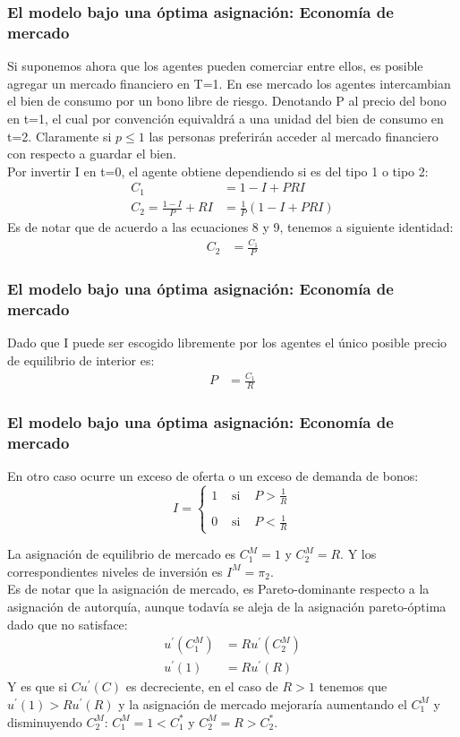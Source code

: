 \begin{frame}
    \frametitle{{\normalsize El modelo bajo una óptima asignación: Economía de mercado } {}}
    Si suponemos ahora que los agentes pueden comerciar entre ellos, es posible agregar un mercado financiero en T=1. En ese mercado los agentes intercambian el bien de consumo por un bono libre de riesgo. Denotando P al precio del bono en t=1, el cual por convención equivaldrá a una unidad del bien de consumo en t=2. Claramente si $p\leq1 $ las personas preferirán acceder al mercado financiero con respecto a guardar el bien.\\
    Por invertir I en t=0, el agente obtiene dependiendo si es del tipo 1 o tipo 2:
      \begin{align}
      C_{1}&=1-I+PRI\\
      C_{2}=\frac{1-I}{P}+RI&=\frac{1}{P}\left( 1-I+PRI\right) 
      \end{align}
    Es de notar que de acuerdo a las ecuaciones 8 y 9, tenemos a siguiente identidad:
     \begin{align}
     C_{2}&=\frac{C_{1}}{P}
    \end{align}

 \end{frame}

\begin{frame}
\frametitle{{\normalsize El modelo bajo una óptima asignación: Economía de mercado } {}}
Dado que I puede ser escogido libremente por los agentes el único  posible precio de equilibrio de interior es:
\begin{align}
P&=\frac{C_{1}}{R}
\end{align}
\end{frame}


\begin{frame}
    \frametitle{{\normalsize El modelo bajo una óptima asignación: Economía de mercado } {}}
    En otro caso ocurre un exceso de oferta o un exceso de demanda de bonos:
     \[
    I= \left\{ \begin{array}{lcl}
    1 & \mbox{ si } & P>\frac{1}{R} \\
    & & \\
    0 & \mbox{ si } & P<\frac{1}{R}
    \end{array}
    \right.
    \]
    
    La asignación de equilibrio de mercado es $C_{1}^{M}=1$ y $C_{2}^{M}=R$. Y los correspondientes niveles de inversión es $ I^{M}=\pi_{2}$.\\
    Es de notar que la asignación de mercado, es Pareto-dominante respecto a la asignación de autorquía, aunque todavía se aleja de la asignación pareto-óptima dado que no satisface:
    \begin{align}
    u^{'}(C_{1}^{M})&=Ru^{'}(C_{2}^{M})\nonumber \\
    u^{'}(1)&=Ru^{'}(R)\nonumber
    \end{align}
    Y es que si $Cu^{'}(C)$ es decreciente, en el caso de $R>1$ tenemos que $u^{'}(1)>Ru^{'}(R)$ y la asignación de mercado mejoraría aumentando el $C_{1}^{M}$ y disminuyendo $C_{2}^{M}$: $C_{1}^{M}=1<C_{1}^{*} $ y $C_{2}^{M}=R>C_{2}^{*} $.
    \end{frame}




